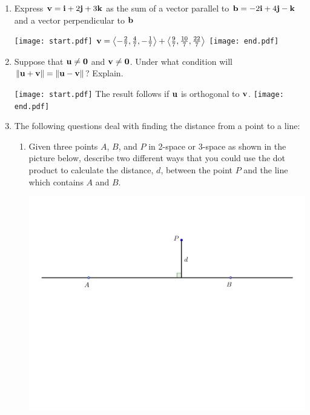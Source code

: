 \documentclass[12pt]{article}
\begin{document}
\begin{enumerate}
\begin{enumerate}
\end{enumerate}

\item Express ${\bf v}={\bf i}+2{\bf j}+3{\bf k}$ as the sum of a vector parallel to ${\bf b}=-2{\bf i}+4{\bf j}-{\bf k}$ and a vector perpendicular to ${\bf b}$

\texttt{[image: start.pdf]}
{{${\bf v}=\left\langle-\frac{2}{7},\frac{4}{7},-\frac{1}{7}\right\rangle+\left\langle \frac{9}{7},\frac{10}{7},\frac{22}{7}\right\rangle$}}
\texttt{[image: end.pdf]}


\item Suppose that ${\bf u} \neq {\bf 0}$ and ${\bf v} \neq {\bf 0}$.  Under what condition will $\|{\bf u}+{\bf v}\|=\|{\bf u}-{\bf v}\|$?  Explain.

\texttt{[image: start.pdf]}
{{The result follows if ${\bf u}$ is orthogonal to ${\bf v}$.}}
\texttt{[image: end.pdf]}


\item The following questions deal with finding the distance from a point to a line:

\begin{enumerate}

\item Given three points $A$, $B$, and $P$ in 2-space or 3-space as shown in the picture below, describe two different ways that you could use the dot product to calculate the distance, $d$, between the point $P$ and the line which contains $A$ and $B$.

\begin{center}
\includegraphics[scale=0.5]{length.pdf}
\end{center}


\end{enumerate}
\end{enumerate}
\end{document}
